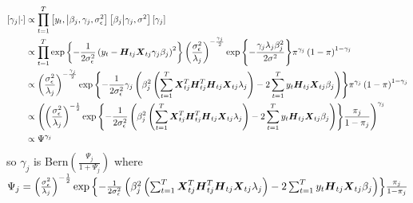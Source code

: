 \documentclass[fleqn]{article}
\def\bm#1{\mbox{\boldmath $#1$}}
\begin{document}
\begin{align*}
%
\left[ \gamma_j \middle| \cdot \right] & \propto \prod_{t = 1}^T \left[ y_t, \middle| \beta_j, \gamma_j, \sigma^2_\epsilon \right] \left[ \beta_j \middle| \gamma_j, \sigma^2 \right] \left[ \gamma_j \right] \\
%
& \propto \prod_{t = 1}^T \exp{ \left\{ - \frac{1} {2 \sigma^2_\epsilon} \left( y_t - \bm{H}_{t j} \bm{X}_{t j} \gamma_j \beta_j \right)^2 \right\} } \left( \frac{\sigma^2_\epsilon} {\lambda_j} \right)^{ - \frac{\gamma_j} {2} } \exp{ \left\{ - \frac{\gamma_j \lambda_j \beta_j^2} {2 \sigma^2} \right\} } \pi^{\gamma_j} \left( 1 - \pi \right)^{1 - \gamma_j} \\
%
& \propto \left( \frac{\sigma^2_\epsilon} {\lambda_j} \right)^{ - \frac{\gamma_j} {2} } \exp{ \left\{ - \frac{1} {2 \sigma^2_\epsilon} \gamma_j \left( \beta_j^2 \left( \sum_{t = 1}^T \bm{X}_{t j}^T \bm{H}_{t j}^T \bm{H}_{t j} \bm{X}_{t j} \lambda_j \right) - 2 \sum_{t = 1}^T y_t \bm{H}_{t j} \bm{X}_{t j} \beta_j \right) \right\} } \pi^{\gamma_j} \left( 1 - \pi \right)^{1 - \gamma_j} \\
%
& \propto \left( \left( \frac{\sigma^2_\epsilon} {\lambda_j} \right)^{ - \frac{1} {2} } \exp{ \left\{ - \frac{1} {2 \sigma^2_\epsilon} \left( \beta_j^2 \left(\sum_{t = 1}^T \bm{X}_{t j}^T \bm{H}_{t j}^T \bm{H}_{t j} \bm{X}_{t j} \lambda_j \right) - 2 \sum_{t = 1}^T y_t \bm{H}_{t j} \bm{X}_{t j} \beta_j \right) \right\} } \frac{\pi_j} {1 - \pi_j} \right)^{\gamma_j} \\
%
& \propto \Psi^{\gamma_j}
%
\end{align*}
%
so $\gamma_j$ is Bern$\left( \frac{\Psi_j} {1 + \Psi_j} \right)$ where $\Psi_j =   \left( \frac{\sigma^2_\epsilon} {\lambda_j} \right)^{ - \frac{1} {2} } \exp{ \left\{ - \frac{1} {2 \sigma^2_\epsilon} \left( \beta_j^2 \left(\sum_{t = 1}^T \bm{X}_{t j}^T \bm{H}_{t j}^T \bm{H}_{t j} \bm{X}_{t j} \lambda_j \right) - 2 \sum_{t = 1}^T y_t \bm{H}_{t j} \bm{X}_{t j} \beta_j \right) \right\} } \frac{\pi_j} {1 - \pi_j}$
%
\end{document}
